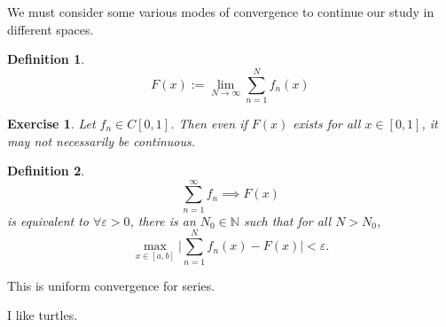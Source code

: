 \documentclass{article}
\newtheorem{defn}{Definition}[section]
\newtheorem{exer}{Exercise}[section]
\begin{document}
We must consider some various modes of convergence to continue our study in different spaces.

\begin{defn}
$$
F(x) := \lim_{N \to \infty} \sum_{n=1}^{N} f_{n}(x)
$$
\end{defn}

\begin{exer}
Let $f_{n} \in C[0,1]$. Then even if $F(x)$ exists for all $x \in [0,1]$, it may not necessarily be continuous.
\end{exer}

\begin{defn}
$$
\sum_{n=1}^{\infty} f_{n} \implies F(x)
$$
is equivalent to $\forall \varepsilon >0$, there is an $N_{0} \in \mathbb{N}$ such that for all $N > N_{0}$,
$$
\max_{x \in [a,b]} \Big\vert \sum_{n=1}^{N} f_{n}(x) - F(x) \Big\vert < \varepsilon.
$$
\end{defn}
This is uniform convergence for series.


I like turtles.
\end{document}
